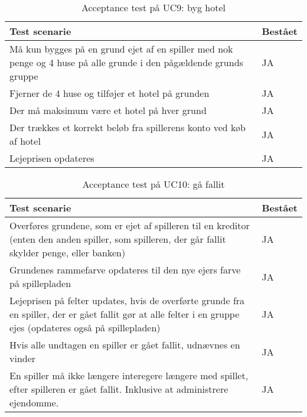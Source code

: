 \documentclass[class=article, crop=false]{standalone}
\begin{document}
    \begin{table}[H]
        \caption{Acceptance test på UC9: byg hotel}
        \begin{tabularx}{\textwidth}{|X|l|}
            \hline
            \textbf{Test scenarie}       & \textbf{Bestået}   \\ \hline
            Må kun bygges på en grund ejet af en spiller med nok penge og 4 huse på alle grunde i den pågældende grunds gruppe     & JA \\ \hline
            Fjerner de 4 huse og tilføjer et hotel på grunden     & JA\\ \hline
            Der må maksimum være et hotel på hver grund     & JA\\ \hline
            Der trækkes et korrekt beløb fra spillerens konto ved køb af hotel     & JA\\ \hline
            Lejeprisen opdateres     & JA \\ \hline
        \end{tabularx}
    \end{table}

    \begin{table}[H]
        \caption{Acceptance test på UC10: gå fallit}
        \begin{tabularx}{\textwidth}{|X|l|}
            \hline
            \textbf{Test scenarie}       & \textbf{Bestået}   \\ \hline
            Overføres grundene, som er ejet af spilleren til en kreditor (enten den anden spiller, som spilleren, der går fallit skylder penge, eller banken) & JA\\ \hline
            Grundenes rammefarve opdateres til den nye ejers farve på spillepladen & JA\\ \hline
            Lejeprisen på felter updates, hvis de overførte grunde fra en spiller, der er gået fallit gør at alle felter i en gruppe ejes (opdateres også på spillepladen) & JA\\ \hline
            Hvis alle undtagen en spiller er gået fallit, udnævnes en vinder& JA\\ \hline
            En spiller må ikke længere interegere længere med spillet, efter spilleren er gået fallit. Inklusive at administrere ejendomme.& JA \\ \hline
        \end{tabularx}
    \end{table}
\end{document}
